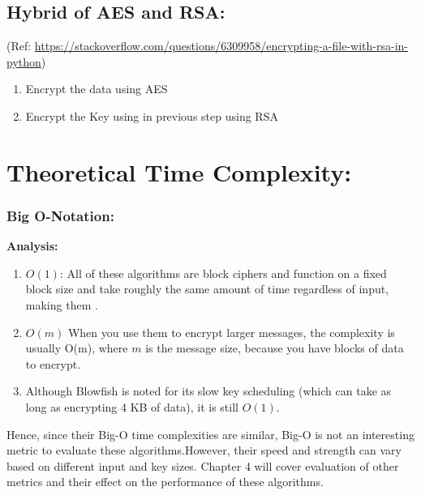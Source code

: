 \documentclass[a4paper]{report} %
\begin{document}
\section{Hybrid of AES and RSA:} 
(Ref: \url{https://stackoverflow.com/questions/6309958/encrypting-a-file-with-rsa-in-python})
\begin{enumerate}
    \item Encrypt the data using AES 
    \item Encrypt the Key using in previous step using RSA 
\end{enumerate}
\chapter{Theoretical Time Complexity:}
\subsection{Big O-Notation:}
\textbf{Analysis:}
\begin{enumerate}
    \item $O(1)$: All of these algorithms are block ciphers and function on a fixed block size and take roughly the same amount of time regardless of input, making them .
    \item $O(m)$ When you use them to encrypt larger messages, the complexity is usually O(m), where $m$ is the message size, because you have blocks of data to encrypt.
    \item Although Blowfish is noted for its slow key scheduling (which can take as long as encrypting 4 KB of data), it is still $O(1)$.
\end{enumerate}
Hence, since their Big-O time complexities are similar, Big-O is not an interesting metric to evaluate these algorithms.However, their speed and strength can vary based on  different input and key sizes. Chapter 4 will cover evaluation of other metrics and their effect on the performance of these algorithms.
\end{document}
